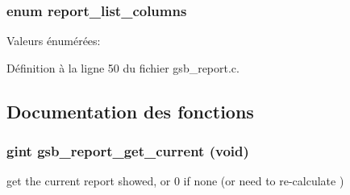 \subsubsection[{report\_\-list\_\-columns}]{\setlength{\rightskip}{0pt plus 5cm}enum {\bf report\_\-list\_\-columns}}\label{gsb__report_8c_a01fc640f214032deed761e858444bab3}
\begin{Desc}
\item[Valeurs énumérées: ]\par
\begin{description}
\item[{\em 
REPORT\_\-COL\_\-NAME\label{gsb__report_8c_a01fc640f214032deed761e858444bab3aa65b427a890565be57d1d9e59dae594e}
}]\item[{\em 
REPORT\_\-COL\_\-NUMBER\label{gsb__report_8c_a01fc640f214032deed761e858444bab3a6805d37ea10e37a89410b31840940984}
}]\item[{\em 
REPORT\_\-COL\_\-VIEW\label{gsb__report_8c_a01fc640f214032deed761e858444bab3a41c0c348b67e5a0fda6c24c62ac0b07d}
}]\end{description}
\end{Desc}



Définition à la ligne 50 du fichier gsb\_\-report.c.



\subsection{Documentation des fonctions}
\subsubsection[{gsb\_\-report\_\-get\_\-current}]{\setlength{\rightskip}{0pt plus 5cm}gint gsb\_\-report\_\-get\_\-current (void)}\label{gsb__report_8c_aec0b1b2d20d93937ab296c312cba6016}
get the current report showed, or 0 if none (or need to re-\/calculate )


